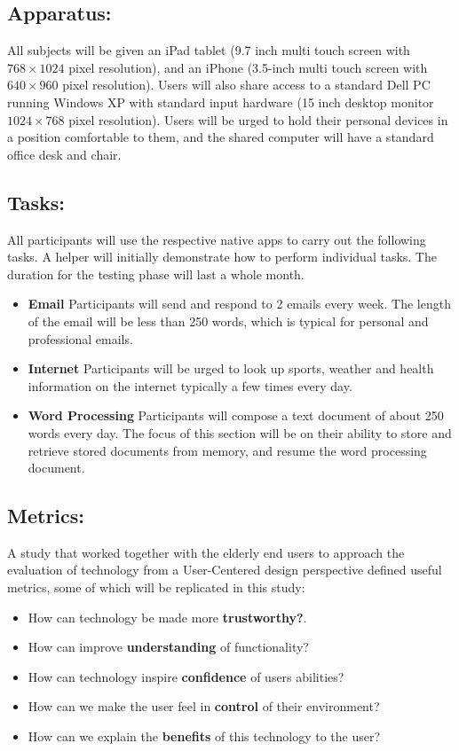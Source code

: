 \documentclass[12pt,draftcls,onecolumn]{IEEEtran}
\begin{document}
\subsection{Apparatus:}
All subjects will be given an iPad tablet (9.7 inch multi touch screen  with $768\times1024$ pixel resolution), and an iPhone (3.5-inch multi touch screen with  $640\times960$ pixel resolution). Users will also share access to a standard Dell PC running Windows XP with standard input hardware (15 inch desktop monitor $1024\times768$ pixel resolution). Users will be urged to hold their personal devices in a position comfortable to them, and the shared computer will have a standard office desk and chair.

\subsection{Tasks:}
All participants will use the respective native apps to carry out the following tasks. A helper will initially demonstrate how to perform individual tasks. The duration for the testing phase will last a whole month. 

\begin{itemize}
  \item \textbf{Email} Participants will send and respond to 2 emails every week. The length of the email will be less than 250 words, which is typical for personal and professional emails.
  \item \textbf{Internet} Participants will be urged to look up sports, weather and health information on the internet typically a few times every day.
  \item \textbf{Word Processing} Participants will compose a text document of about 250 words every day. The focus of this section will be on their ability to store and retrieve stored documents from memory, and resume the word processing document.
\end{itemize}

\subsection{Metrics:}
A study \cite{holzinger2008investigating} that worked together with the elderly end users to approach the evaluation of technology from a User-Centered design perspective defined useful metrics, some of which will be replicated in this study:

\begin{itemize}
  \item How can technology be made more \textbf{trustworthy?}.
  \item How can improve \textbf{understanding} of functionality?
  \item How can technology inspire \textbf{confidence} of users abilities?
  \item How can we make the user feel in \textbf{control} of their environment?
  \item How can we explain the \textbf{benefits} of this technology to the user?
\end{itemize}
\end{document}

